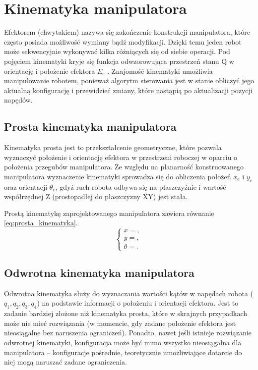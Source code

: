 \documentclass[printmode]{mgr}
\begin{document}
\section{Kinematyka manipulatora}
Efektorem (chwytakiem) nazywa się zakończenie konstrukcji manipulatora, które często posiada możliwość wymiany bądź modyfikacji. 
Dzięki temu jeden robot może sekwencyjnie wykonywać kilka różniących się od siebie operacji. Pod pojęciem kinematyki kryje się
funkcja odwzorowująca przestrzeń stanu Q w orientację i położenie efektora $E_e$ \cite{podstawy_robotyki}.
Znajomość kinematyki umożliwia manipulowanie robotem, ponieważ algorytm sterowania
jest w stanie obliczyć jego aktualną konfigurację i przewidzieć zmiany, które nastąpią po aktualizacji pozycji napędów.

\subsection{Prosta kinematyka manipulatora}\label{sec:prosta_kinematyka}
Kinematyka prosta jest to przekształcenie geometryczne,
które pozwala wyznaczyć położenie i orientację efektora w przestrzeni roboczej w oparciu o położenia przegubów manipulatora.
Ze względu na planarność konstruowanego manipulatora wyznaczenie kinematyki sprowadza się do obliczenia położeń $x_e$ i $y_e$ oraz
orientacji $\theta_e$, gdyż
ruch robota odbywa się na płaszczyźnie i wartość współrzędnej Z (prostopadłej do płaszczyzny XY) jest stała.

Prostą kinematykę zaprojektowanego manipulatora zawiera równanie \ref{eq:prosta_kinematyka}.
\begin{equation}
\begin{cases}
x = ,\\
y = ,\\
\theta = .
\end{cases}
\label{eq:prosta_kinematyka}
\end{equation}

\subsection{Odwrotna kinematyka manipulatora}
Odwrotna kinematyka służy do wyznaczania wartości kątów w napędach robota ($q_1, q_2, q_3, q_4$) na podstawie informacji o 
położeniu i orientacji efektora. Jest to zadanie bardziej złożone niż kinematyka prosta, które w skrajnych przypadkach
może nie mieć rozwiązania (w momencie, gdy zadane położenie efektora jest nieosiągalne bez naruszenia ograniczeń). 
Ponadto, nawet jeśli istnieje rozwiązanie odwrotnej kinematyki, konfiguracja może być mimo wszystko nieosiągalna dla manipulatora
-- konfiguracje pośrednie, teoretycznie umożliwiające dotarcie do niej mogą naruszać zadane ograniczenia.
\end{document}
